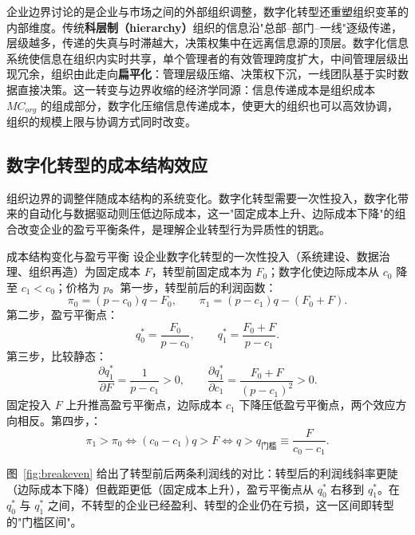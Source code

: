 企业边界讨论的是企业与市场之间的外部组织调整，数字化转型还重塑组织变革的内部维度。传统\textbf{科层制（hierarchy）}组织的信息沿"总部--部门--一线"逐级传递，层级越多，传递的失真与时滞越大，决策权集中在远离信息源的顶层。数字化信息系统使信息在组织内实时共享，单个管理者的有效管理跨度扩大，中间管理层级出现冗余，组织由此走向\textbf{扁平化}：管理层级压缩、决策权下沉，一线团队基于实时数据直接决策。这一转变与边界收缩的经济学同源：信息传递成本是组织成本 $MC_{org}$ 的组成部分，数字化压缩信息传递成本，使更大的组织也可以高效协调，组织的规模上限与协调方式同时改变。

\subsection{数字化转型的成本结构效应}

组织边界的调整伴随成本结构的系统变化。数字化转型需要一次性投入，数字化带来的自动化与数据驱动则压低边际成本，这一"固定成本上升、边际成本下降"的组合改变企业的盈亏平衡条件，是理解企业转型行为异质性的钥匙。

\begin{derivation}{成本结构变化与盈亏平衡}{}
设企业数字化转型的一次性投入（系统建设、数据治理、组织再造）为固定成本 $F$，转型前固定成本为 $F_0$；数字化使边际成本从 $c_0$ 降至 $c_1 < c_0$；价格为 $p$。第一步，转型前后的利润函数：
\[
\pi_0 = (p - c_0) q - F_0, \qquad \pi_1 = (p - c_1) q - (F_0 + F).
\]
第二步，盈亏平衡点：
\[
q_0^* = \frac{F_0}{p - c_0}, \qquad q_1^* = \frac{F_0 + F}{p - c_1}.
\]
第三步，比较静态：
\[
\frac{\partial q_1^*}{\partial F} = \frac{1}{p - c_1} > 0, \qquad \frac{\partial q_1^*}{\partial c_1} = \frac{F_0 + F}{(p - c_1)^2} > 0.
\]
固定投入 $F$ 上升推高盈亏平衡点，边际成本 $c_1$ 下降压低盈亏平衡点，两个效应方向相反。第四步，：
\[
\pi_1 > \pi_0 \iff (c_0 - c_1) q > F \iff q > q_{\text{门槛}} \equiv \frac{F}{c_0 - c_1}.
\]
\end{derivation}

图~\ref{fig:breakeven} 给出了转型前后两条利润线的对比：转型后的利润线斜率更陡（边际成本下降）但截距更低（固定成本上升），盈亏平衡点从 $q_0^*$ 右移到 $q_1^*$。在 $q_0^*$ 与 $q_1^*$ 之间，不转型的企业已经盈利、转型的企业仍在亏损，这一区间即转型的"门槛区间"。

